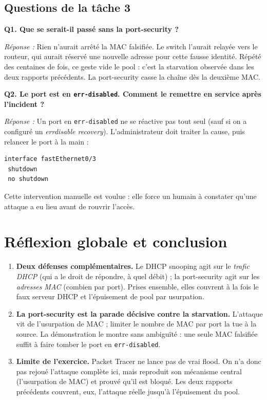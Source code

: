 \documentclass[11pt,a4paper]{article}
\begin{document}
\subsection{Questions de la tâche 3}
\textbf{Q1. Que se serait-il passé sans la port-security ?}

\textit{Réponse :} Rien n'aurait arrêté la MAC falsifiée. Le switch l'aurait relayée vers le
routeur, qui aurait réservé une nouvelle adresse pour cette fausse identité. Répété des
centaines de fois, ce geste vide le pool : c'est la starvation observée dans les deux rapports
précédents. La port-security casse la chaîne dès la deuxième MAC.

\medskip\noindent\textbf{Q2. Le port est en \texttt{err-disabled}. Comment le remettre en service
après l'incident ?}

\textit{Réponse :} Un port en \texttt{err-disabled} ne se réactive pas tout seul (sauf si on a
configuré un \emph{errdisable recovery}). L'administrateur doit traiter la cause, puis relancer
le port à la main :
\begin{lstlisting}
interface fastEthernet0/3
 shutdown
 no shutdown
\end{lstlisting}
Cette intervention manuelle est voulue : elle force un humain à constater qu'une attaque a eu
lieu avant de rouvrir l'accès.

\section{Réflexion globale et conclusion}
\begin{enumerate}[leftmargin=1.6em]
  \item \textbf{Deux défenses complémentaires.} Le DHCP snooping agit sur le \emph{trafic DHCP}
        (qui a le droit de répondre, à quel débit) ; la port-security agit sur les \emph{adresses
        MAC} (combien par port). Prises ensemble, elles couvrent à la fois le faux serveur DHCP
        et l'épuisement de pool par usurpation.

  \item \textbf{La port-security est la parade décisive contre la starvation.} L'attaque vit de
        l'usurpation de MAC ; limiter le nombre de MAC par port la tue à la source. La
        démonstration le montre sans ambiguïté : une seule MAC falsifiée suffit à faire tomber
        le port en \texttt{err-disabled}.

  \item \textbf{Limite de l'exercice.} Packet Tracer ne lance pas de vrai flood. On n'a donc pas
        rejoué l'attaque complète ici, mais reproduit son mécanisme central (l'usurpation de MAC)
        et prouvé qu'il est bloqué. Les deux rapports précédents couvrent, eux, l'attaque réelle
        jusqu'à l'épuisement du pool.
\end{enumerate}
\end{document}
